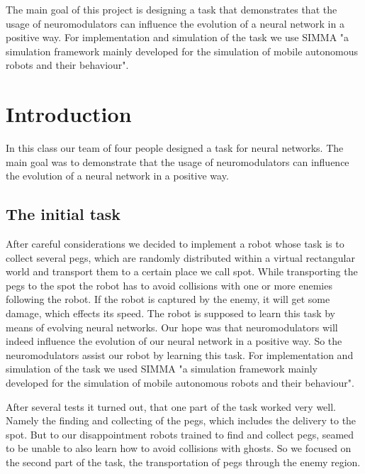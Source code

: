 \documentclass[12pt,fleqn,a4paper]{article}
\begin{document}
\clearpage
\pagestyle{headings}
\setcounter{page}{1}
\setcounter{page}{1}

\tableofcontents
\newpage

\abstract
{The main goal of this project is designing a task that demonstrates that the usage of neuromodulators can influence the evolution of a neural network in a positive way. For implementation and simulation of the task we use SIMMA "a simulation framework mainly developed for the simulation of mobile autonomous robots and their behaviour".}

\section{Introduction}
In this class our team of four people designed a task for neural networks.  The main goal was to demonstrate that the usage of neuromodulators can influence the evolution of a neural network in a positive way.

\subsection{The initial task}
After careful considerations we decided to implement a robot whose task is to collect several pegs, which are randomly distributed within a virtual rectangular world and transport them to a certain place we call spot. While transporting the pegs to the spot the robot has to avoid collisions with one or more enemies following the robot. If the robot is captured by the enemy, it will get some damage, which effects its speed. The robot is supposed to learn this task by means of evolving neural networks. Our hope was that neuromodulators will indeed influence the evolution of our neural network in a positive way. So the neuromodulators assist our robot by learning this task. For implementation and simulation of the task we used SIMMA "a simulation framework mainly developed for the simulation of mobile autonomous robots and their behaviour".

After several tests it turned out, that one part of the task worked very well. Namely the finding and collecting of the pegs, which includes the delivery to the spot. But to our disappointment robots trained to find and collect pegs, seamed to be unable to also learn how to avoid collisions with ghosts. So we focused on the second part of the task, the transportation of pegs through the enemy region.
\end{document}
